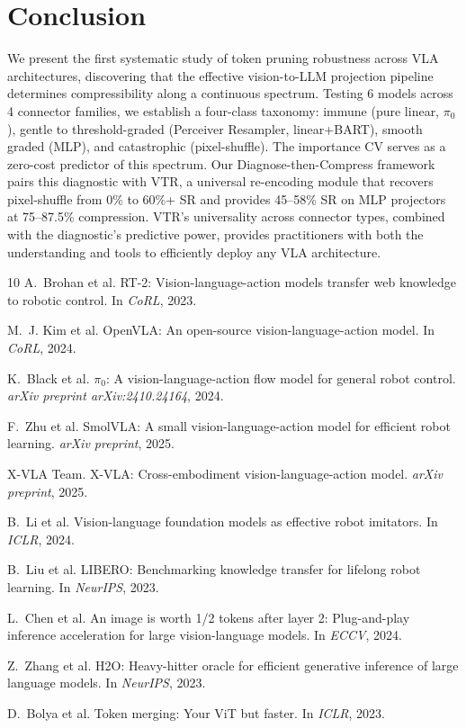 \documentclass[letterpaper]{article}
\begin{document}
\section{Conclusion}

We present the first systematic study of token pruning robustness across VLA architectures, discovering that the effective vision-to-LLM projection pipeline determines compressibility along a continuous spectrum. Testing 6 models across 4 connector families, we establish a four-class taxonomy: immune (pure linear, $\pi_0$), gentle to threshold-graded (Perceiver Resampler, linear+BART), smooth graded (MLP), and catastrophic (pixel-shuffle). The importance CV serves as a zero-cost predictor of this spectrum. Our Diagnose-then-Compress framework pairs this diagnostic with VTR, a universal re-encoding module that recovers pixel-shuffle from 0\% to 60\%+ SR and provides 45--58\% SR on MLP projectors at 75--87.5\% compression. VTR's universality across connector types, combined with the diagnostic's predictive power, provides practitioners with both the understanding and tools to efficiently deploy any VLA architecture.




\begin{thebibliography}{10}
A.~Brohan et al.
\newblock RT-2: Vision-language-action models transfer web knowledge to robotic control.
\newblock In \emph{CoRL}, 2023.

M.~J. Kim et al.
\newblock OpenVLA: An open-source vision-language-action model.
\newblock In \emph{CoRL}, 2024.

K.~Black et al.
\newblock $\pi_0$: A vision-language-action flow model for general robot control.
\newblock \emph{arXiv preprint arXiv:2410.24164}, 2024.

F.~Zhu et al.
\newblock SmolVLA: A small vision-language-action model for efficient robot learning.
\newblock \emph{arXiv preprint}, 2025.

X-VLA Team.
\newblock X-VLA: Cross-embodiment vision-language-action model.
\newblock \emph{arXiv preprint}, 2025.

B.~Li et al.
\newblock Vision-language foundation models as effective robot imitators.
\newblock In \emph{ICLR}, 2024.

B.~Liu et al.
\newblock LIBERO: Benchmarking knowledge transfer for lifelong robot learning.
\newblock In \emph{NeurIPS}, 2023.

L.~Chen et al.
\newblock An image is worth 1/2 tokens after layer 2: Plug-and-play inference acceleration for large vision-language models.
\newblock In \emph{ECCV}, 2024.

Z.~Zhang et al.
\newblock H2O: Heavy-hitter oracle for efficient generative inference of large language models.
\newblock In \emph{NeurIPS}, 2023.

D.~Bolya et al.
\newblock Token merging: Your ViT but faster.
\newblock In \emph{ICLR}, 2023.
\end{thebibliography}
\end{document}
